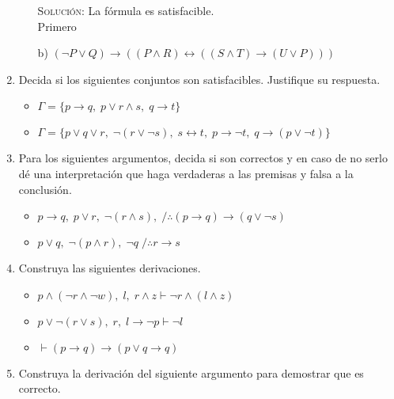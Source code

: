 \documentclass[letterpaper,11pt]{article}
\begin{document}
\begin{enumerate}
\begin{itemize}
        \textsc{Solución:} La fórmula es satisfacible. \\ 
        Primero 

        \item[b)] $(\neg P \lor Q) → ((P \land R) ↔ ((S \land T) → (U \lor P)))$
    \end{itemize}

    \item Decida si los siguientes conjuntos son satisfacibles. Justifique 
    su respuesta.

    \begin{itemize}
        \item $\Gamma = \{p → q, \; p \lor r \land s, \; q → t\}$
        \item $\Gamma = \{p \lor q \lor r, \; \neg (r \lor \neg s), \; s ↔ t, \;
                          p → \neg t, \; q → (p \lor \neg t)\}$        
    \end{itemize}

    \item Para los siguientes argumentos, decida si son correctos y en caso de 
    no serlo dé una interpretación que haga verdaderas a las premisas y falsa 
    a la conclusión.

    \begin{itemize}
        \item $p → q, \; p \lor r, \; \neg (r \land s), \; /∴ (p → q) → 
               (q \lor \neg s)$
        \item $p \lor q, \; \neg (p \land r), \; \neg q \; /∴ r → s$
    \end{itemize}

    \item Construya las siguientes derivaciones.

    \begin{itemize}
        \item $p \land (\neg r \land \neg w), \; l, \; r \land z ⊢ \neg r 
               \land (l \land z)$
        \item $p \lor \neg(r \lor s), \; r, \; l → \neg p ⊢ \neg l$
        \item $⊢(p → q) → (p \lor q → q)$
    \end{itemize}

    \item Construya la derivación del siguiente argumento para demostrar que es 
    correcto.


\end{enumerate}
\end{document}
